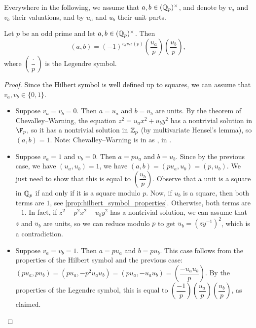 Everywhere in the following, we assume that $a, b \in (\mathbb{Q}_p)^\times$, and denote by $v_a$ and $v_b$
their valuations, and by $u_a$ and $u_b$ their unit parts.

\begin{theorem}
	\label{thm:padic_odd_p}
	\leanok
Let $p$ be an odd prime and let $a, b \in (\mathbb{Q}_p)^\times$. Then
\[(a,b) = (-1)^{v_a v_b\epsilon(p)}\left(\dfrac{u_a}{p}\right) \left(\dfrac{u_b}{p}\right),\]
where $\left(\dfrac{\cdot}{p}\right)$ is the Legendre symbol.
\end{theorem}

\begin{proof}
	Since the Hilbert symbol is well defined up to squares, we can assume that $v_a, v_b \in \{0, 1\}$.
	\begin{itemize}
		\item Suppose $v_a=v_b=0$. Then $a=u_a$ and $b=u_b$ are units. By the theorem of Chevalley--Warning,
		the equation $z^2 = u_a x^2 + u_b y^2$ has a nontrivial solution in $\F_p$, so it has a
		nontrivial solution in $\mathbb{Z}_p$ (by multivariate Hensel's lemma), so $(a,b)=1$.
		Note: Chevalley--Warning is in \mathlib as , in .
		\item Suppose $v_a=1$ and $v_b=0$. Then $a=p u_a$ and $b=u_b$. Since by the previous case, we
		have $(u_a, u_b)=1$, we have $(a,b) = (p u_a, u_b) = (p, u_b)$. We just need to show that this is
		equal to $\left(\dfrac{u_b}{p}\right)$. Observe that a unit is a square in $\mathbb{Q}_p$ if and only if
		it is a square modulo $p$. Now, if $u_b$ is a square, then both terms are $1$, see
		\ref{prop:hilbert_symbol_properties}. Otherwise, both terms are $-1$. In fact,
		if $z^2-p^2x^2-u_by^2$ has a nontrivial solution, we can assume that $z$ and $u_b$ are units, so
		we can reduce modulo $p$ to get $u_b = (zy^{-1})^2$, which is a contradiction.
		\item Suppose $v_a=v_b=1$. Then $a=p u_a$ and $b=p u_b$. This case follows from the properties of
		the Hilbert symbol and the previous case: $(pu_a,pu_b)=(pu_a, -p^2u_au_b)= (pu_a, -u_au_b)=
		\left(\dfrac{-u_au_b}{p}\right)$. By the properties of the Legendre symbol, this is equal to
		$\left(\dfrac{-1}{p}\right)\left(\dfrac{u_a}{p}\right)\left(\dfrac{u_b}{p}\right)$, as claimed.
	\end{itemize}
\end{proof}

